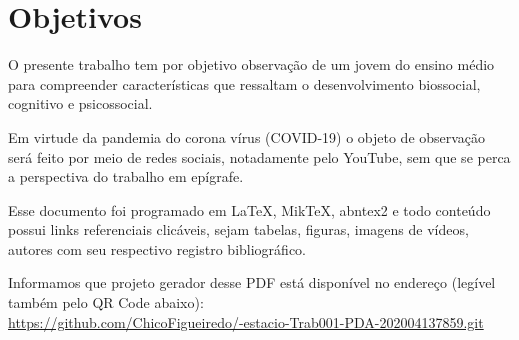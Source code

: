 \chapter{Objetivos}

O presente trabalho tem por objetivo observação de um jovem do ensino médio para compreender características  que ressaltam o  desenvolvimento biossocial, cognitivo e psicossocial.

Em virtude da pandemia do corona vírus (COVID-19) o objeto de observação será feito por meio de redes sociais, notadamente pelo YouTube, sem que se perca a perspectiva do trabalho em epígrafe.

Esse documento foi programado em \LaTeX, MikTeX, abntex2 e todo conteúdo possui links referenciais clicáveis, sejam tabelas, figuras, imagens de vídeos, autores com seu respectivo registro bibliográfico.
  
Informamos que projeto gerador desse PDF está disponível no endereço (legível também pelo QR Code abaixo): \\
\url{https://github.com/ChicoFigueiredo/-estacio-Trab001-PDA-202004137859.git} \\
\begin{center}
    \href{https://github.com/ChicoFigueiredo/-estacio-Trab001-PDA-202004137859.git}{
    }
\end{center}

